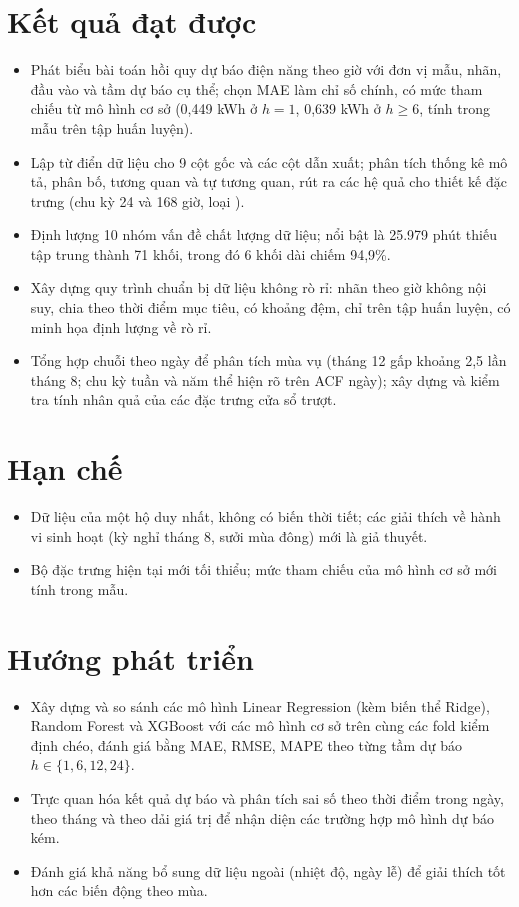 \documentclass[../main.tex]{subfiles}
\begin{document}
\section*{Kết quả đạt được}
\begin{itemize}
    \item Phát biểu bài toán hồi quy dự báo điện năng theo giờ với đơn vị mẫu, nhãn, đầu vào và tầm dự báo cụ thể; chọn MAE làm chỉ số chính, có mức tham chiếu từ mô hình cơ sở (0,449 kWh ở $h=1$, 0,639 kWh ở $h \ge 6$, tính trong mẫu trên tập huấn luyện).
    \item Lập từ điển dữ liệu cho 9 cột gốc và các cột dẫn xuất; phân tích thống kê mô tả, phân bố, tương quan và tự tương quan, rút ra các hệ quả cho thiết kế đặc trưng (chu kỳ 24 và 168 giờ, loại ).
    \item Định lượng 10 nhóm vấn đề chất lượng dữ liệu; nổi bật là 25.979 phút thiếu tập trung thành 71 khối, trong đó 6 khối dài chiếm 94,9\%.
    \item Xây dựng quy trình chuẩn bị dữ liệu không rò rỉ: nhãn theo giờ không nội suy, chia theo thời điểm mục tiêu,  có khoảng đệm,  chỉ  trên tập huấn luyện, có minh họa định lượng về rò rỉ.
    \item Tổng hợp chuỗi theo ngày để phân tích mùa vụ (tháng 12 gấp khoảng 2,5 lần tháng 8; chu kỳ tuần và năm thể hiện rõ trên ACF ngày); xây dựng và kiểm tra tính nhân quả của các đặc trưng cửa sổ trượt.
\end{itemize}

\section*{Hạn chế}
\begin{itemize}
    \item Dữ liệu của một hộ duy nhất, không có biến thời tiết; các giải thích về hành vi sinh hoạt (kỳ nghỉ tháng 8, sưởi mùa đông) mới là giả thuyết.
    \item Bộ đặc trưng hiện tại mới tối thiểu; mức tham chiếu của mô hình cơ sở mới tính trong mẫu.
\end{itemize}

\section*{Hướng phát triển}
\begin{itemize}
    \item Xây dựng và so sánh các mô hình Linear Regression (kèm biến thể Ridge), Random Forest và XGBoost với các mô hình cơ sở trên cùng các fold kiểm định chéo, đánh giá bằng MAE, RMSE, MAPE theo từng tầm dự báo $h \in \{1, 6, 12, 24\}$.
    \item Trực quan hóa kết quả dự báo và phân tích sai số theo thời điểm trong ngày, theo tháng và theo dải giá trị để nhận diện các trường hợp mô hình dự báo kém.
    \item Đánh giá khả năng bổ sung dữ liệu ngoài (nhiệt độ, ngày lễ) để giải thích tốt hơn các biến động theo mùa.
\end{itemize}
\end{document}
